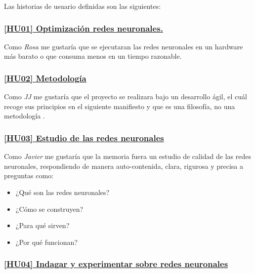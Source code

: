 Las historias de usuario definidas son las siguientes: 

\subsubsection*{\href{https://github.com/BlancaCC/TFG-Estudio-de-las-redes-neuronales/issues/48}{[HU01] Optimización redes neuronales.}
}\label{HU01}
    Como \textit{Rosa} me gustaría que se ejecutaran las redes neuronales en un hardware
    más barato o que consuma menos en un tiempo razonable.
 
\subsubsection*{ \href{https://github.com/BlancaCC/TFG-Estudio-de-las-redes-neuronales/issues/65}{[HU02] Metodología}
} \label{HUO2}

Como \textit{JJ} me gustaría que el proyecto se realizara bajo un desarrollo ágil,  el cuál recoge sus principios en el siguiente manifiesto \cite{principios-manifiesto-agil} y que es una filosofía, no una metodología \cite{why-agile-is-not-a-methodology-1} \cite{why-agile-is-not-a-methodology-2}.

\subsubsection*{ 
    \href{https://github.com/BlancaCC/TFG-Estudio-de-las-redes-neuronales/issues/50}{
    [HU03] Estudio de las redes neuronales}
} \label{HUO3}
Como \textit{Javier} me gustaría que la memoria fuera un estudio de calidad de las redes neuronales, 
respondiendo de manera auto-contenida, clara, rigurosa y precisa a preguntas como:
\begin{itemize}
    \item ¿Qué son las redes neuronales?
    \item ¿Cómo se construyen?
    \item ¿Para qué sirven?
    \item ¿Por qué funcionan?
\end{itemize}


\subsubsection*{ 
\href{https://github.com/BlancaCC/TFG-Estudio-de-las-redes-neuronales/issues/51}{
    [HU04] Indagar y experimentar sobre redes neuronales}    
    } \label{HUO4}

